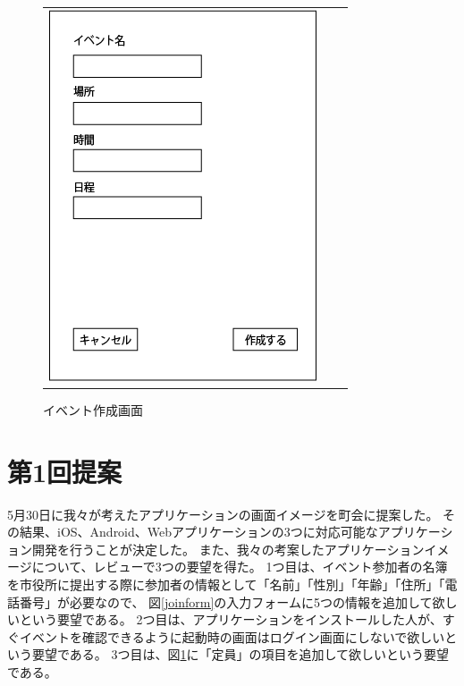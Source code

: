 \begin{figure}[h]
\begin{tabular}{ccc}
\begin{minipage}[t]{0.33\hsize}
        \caption{参加フォーム画面}
        \label{joinform}
      \end{minipage}
      \begin{minipage}[t]{0.33\hsize}
        \centering
        \includegraphics[keepaspectratio, scale=0.4]{process_figures/old_create_event.png}
        \caption{イベント作成画面}
        \label{create_event.old}
      \end{minipage}
    \end{tabular}
\end{figure}

\section{第1回提案}
\label{first_review}
5月30日に我々が考えたアプリケーションの画面イメージを町会に提案した。
その結果、iOS、Android、Webアプリケーションの3つに対応可能なアプリケーション開発を行うことが決定した。
また、我々の考案したアプリケーションイメージについて、レビューで3つの要望を得た。
1つ目は、イベント参加者の名簿を市役所に提出する際に参加者の情報として「名前」「性別」「年齢」「住所」「電話番号」が必要なので、
図\ref{joinform}の入力フォームに5つの情報を追加して欲しいという要望である。
2つ目は、アプリケーションをインストールした人が、すぐイベントを確認できるように起動時の画面はログイン画面にしないで欲しいという要望である。
3つ目は、図\ref{create_event.old}に「定員」の項目を追加して欲しいという要望である。

